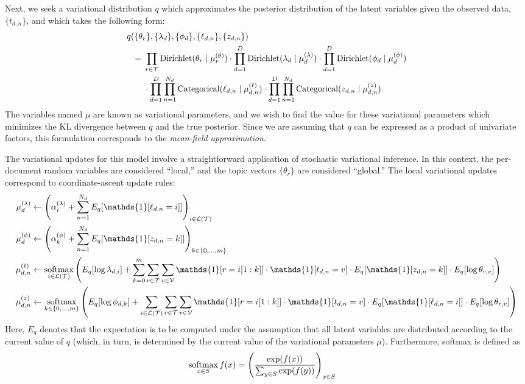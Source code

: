 \documentclass{article}
\newcommand{\indicator}{\mathds{1}}
\begin{document}
Next, we seek a variational distribution $q$ which approximates the posterior distribution of the latent variables given the observed data, $\{t_{d,n}\}$, and which takes the following form:
\begin{align}
\MoveEqLeft
q(\{\theta_r\}, \{\lambda_d\}, \{\phi_d\}, \{\ell_{d,n}\}, \{z_{d,n}\}) \\
={}& \prod_\rPath \text{Dirichlet}(\theta_r \mid \mu^{(\theta)}_r)
\cdot \prod_\dDoc \text{Dirichlet}(\lambda_d \mid \mu^{(\lambda)}_d)
\cdot \prod_\dDoc \text{Dirichlet}(\phi_d \mid \mu^{(\phi)}_d) \nonumber \\
&\cdot \prod_\dDoc \prod_\nWordSlot \text{Categorical}(\ell_{d,n} \mid \mu^{(\ell)}_{d,n})
\cdot \prod_\dDoc \prod_\nWordSlot \text{Categorical}(z_{d,n} \mid \mu^{(z)}_{d,n}). \nonumber
\end{align}
The variables named $\mu$ are known as variational parameters, and we wish to find the value for these variational parameters which minimizes the KL divergence between $q$ and the true posterior.
Since we are assuming that $q$ can be expressed as a product of univariate factors, this formulation corresponds to the \emph{mean-field approximation}.

The variational updates for this model involve a straightforward application of stochastic variational inference.
In this context, the per-document random variables are considered ``local,'' and the topic vectors $\{\theta_r\}$ are considered ``global.''
The local variational updates correspond to coordinate-ascent update rules:
\begin{align}
\mu^{(\lambda)}_d
&\gets \left( \alpha^{(\lambda)}_i + \sum_\nWordSlot E_q[\indicator[\ell_{d,n} = i]] \right)_\iLeaf \\
\mu^{(\phi)}_d
&\gets \left( \alpha^{(\phi)}_k + \sum_\nWordSlot E_q[\indicator[z_{d,n} = k]] \right)_\kDepthSet \\
\mu^{(\ell)}_{d,n}
&\gets \softmax_\iLeaf \left( E_q[\log \lambda_{d,i}] +
\sum_\kDepth \sum_\rPath \sum_\vVocab
\indicator[r = i[1:k]] \cdot \indicator[t_{d,n} = v] \cdot E_q[\indicator[z_{d,n} = k]] \cdot E_q[\log \theta_{r,v}]
\right) \\
\mu^{(z)}_{d,n}
&\gets \softmax_\kDepthSet \left( E_q[\log \phi_{d,k}] +
\sum_\iLeaf \sum_\rPath \sum_\vVocab
\indicator[r = i[1:k]] \cdot \indicator[t_{d,n} = v] \cdot E_q[\indicator[\ell_{d,n} = i]] \cdot E_q[\log \theta_{r,v}]
\right)
\end{align}
Here, $E_q$ denotes that the expectation is to be computed under the assumption that all latent variables are distributed according to the current value of $q$ (which, in turn, is determined by the current value of the variational parameters $\mu$).
Furthermore, softmax is defined as
\begin{align}
\mathop{\text{softmax}}_{x \in S} f(x)
&= \left( \frac{\exp(f(x))}{\sum_{y \in S} \exp(f(y))} \right)_{x \in S}
\end{align}
\end{document}
